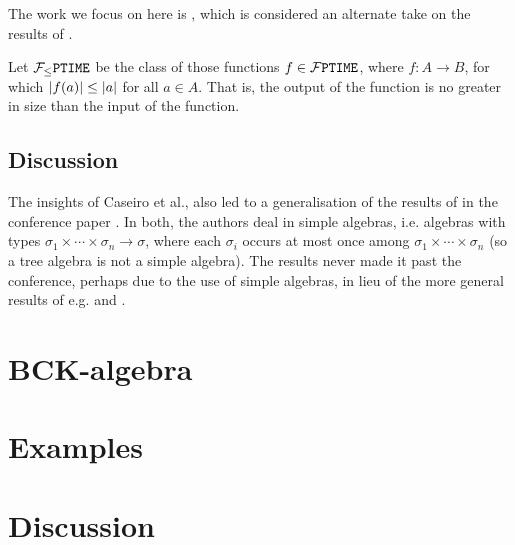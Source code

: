 The work we focus on here is \cite{aehlig-schwichtenberg-2002}, which is
considered an alternate take on the results of \cite{hofmann-2003}.

\begin{definition} Let $\mathcal{F}_{\leq}\mathtt{PTIME}{}$ be the class of those functions $f \in
\mathcal{F}\mathtt{PTIME}{}$, where $f : A \rightarrow B$, for which ${\mathopen{}\left|{f{\mathopen{}\left({a}\right)\mathclose{}}}\right|\mathclose{}} \leq
{\ensuremath{\mathopen{}\left|{a}\right|\mathclose{}}}$ for all $a \in A$. That is, the output of the function is no greater
in size than the input of the function. \end{definition}

\subsection{Discussion}

The insights of Caseiro et al., also led to a generalisation of the results of
\cite{marion-2003} in the conference paper \cite{marion-moyen-2000}. In both,
the authors deal in simple algebras, i.e.  algebras with types $\sigma_1 \times
\cdots \times \sigma_n \rightarrow \sigma$, where each $\sigma_i$ occurs at
most once among $\sigma_1 \times \cdots \times \sigma_n$ (so a tree algebra is
not a simple algebra).  The results never made it past the conference,
perhaps due to the use of simple algebras, in lieu of the more general results
of e.g.  \cite{aehlig-schwichtenberg-2002} and \cite{hofmann-2003}.

\section{BCK-algebra}

\section{Examples}

\section{Discussion}
